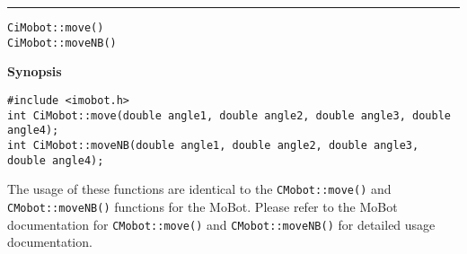 \noindent
\vspace{5pt}
\rule{6.5in}{0.015in}
\noindent
{\LARGE \texttt{CiMobot::move()}}\\
{\LARGE \texttt{CiMobot::moveNB()}}\\
{}

\noindent
{\bf Synopsis}\\
\begin{verbatim}
#include <imobot.h>
int CiMobot::move(double angle1, double angle2, double angle3, double angle4);
int CiMobot::moveNB(double angle1, double angle2, double angle3, double angle4);
\end{verbatim}

The usage of these functions are identical to the
\texttt{CMobot::move()} and \texttt{CMobot::moveNB()} functions for the MoBot.
Please refer to the MoBot documentation for \texttt{CMobot::move()} and
\texttt{CMobot::moveNB()} for
detailed usage documentation.

